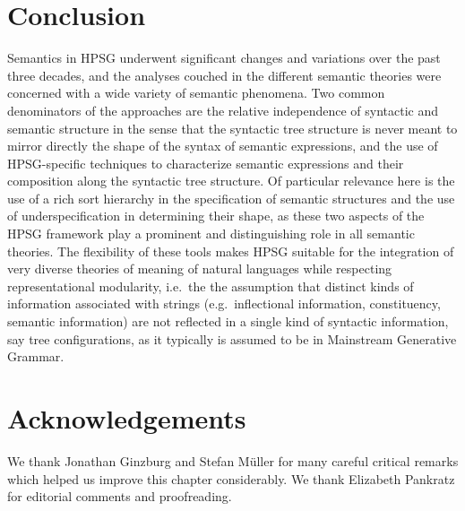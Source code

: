 \documentclass[output=paper]{langsci/langscibook}
\begin{document}
\section{Conclusion}

Semantics in HPSG underwent significant changes and variations over the past three decades, and the analyses couched in the different semantic theories were concerned with a wide variety of semantic phenomena. Two common denominators of the approaches are the relative independence of syntactic and
 semantic structure in the sense that the syntactic tree structure is never meant to mirror directly the shape of the syntax of semantic expressions, and the use of HPSG-specific techniques to characterize semantic expressions and their composition along the syntactic tree structure. Of particular relevance here is the use of a rich sort hierarchy in the specification of semantic structures and the use of underspecification in determining their shape, as these two aspects of the HPSG framework play a prominent and distinguishing role in all semantic theories. The flexibility of these tools makes HPSG suitable for the integration of very diverse theories of meaning of natural languages while respecting representational modularity, i.e.\ the 
the assumption that 
 distinct kinds of information associated with strings (e.g.\ inflectional information, constituency, semantic information) are not reflected in a single kind of syntactic information, say tree configurations, as it typically is assumed to be in Mainstream Generative Grammar.


\section*{Acknowledgements}

We thank Jonathan Ginzburg and Stefan M\"uller for many careful critical remarks which helped
us improve this chapter considerably. We thank
Elizabeth Pankratz for editorial comments and proofreading.


{\sloppy
\printbibliography[heading=subbibliography,notkeyword=this] 
}
\end{document}
